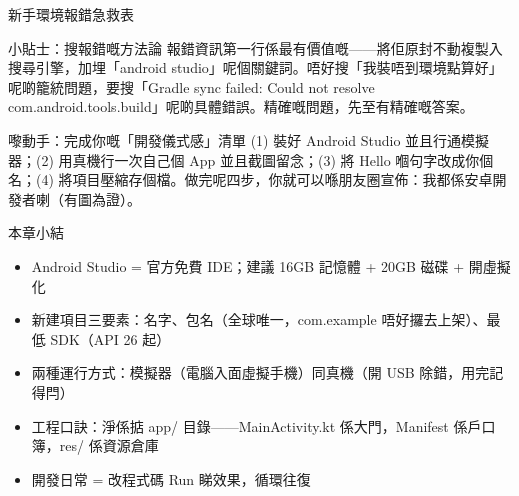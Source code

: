 \begin{center}\small\color{gray}新手環境報錯急救表\end{center}

\begin{tcbinfo}{小貼士：搜報錯嘅方法論}
報錯資訊第一行係最有價值嘅——將佢原封不動複製入搜尋引擎，加埋「android studio」呢個關鍵詞。唔好搜「我裝唔到環境點算好」呢啲籠統問題，要搜「Gradle sync failed: Could not resolve com.android.tools.build」呢啲具體錯誤。精確嘅問題，先至有精確嘅答案。

\end{tcbinfo}

\begin{tcbpractice}{嚟動手：完成你嘅「開發儀式感」清單}
(1) 裝好 Android Studio 並且行通模擬器；(2) 用真機行一次自己個 App 並且截圖留念；(3) 將 Hello 嗰句字改成你個名；(4) 將項目壓縮存個檔。做完呢四步，你就可以喺朋友圈宣佈：我都係安卓開發者喇（有圖為證）。

\end{tcbpractice}

\begin{tcbsummary}{本章小結}
\begin{itemize}
  \item Android Studio = 官方免費 IDE；建議 16GB 記憶體 + 20GB 磁碟 + 開虛擬化
  \item 新建項目三要素：名字、包名（全球唯一，com.example 唔好攞去上架）、最低 SDK（API 26 起）
  \item 兩種運行方式：模擬器（電腦入面虛擬手機）同真機（開 USB 除錯，用完記得閂）
  \item 工程口訣：淨係掂 app/ 目錄——MainActivity.kt 係大門，Manifest 係戶口簿，res/ 係資源倉庫
  \item 開發日常 = 改程式碼 Run 睇效果，循環往復
\end{itemize}

\end{tcbsummary}

